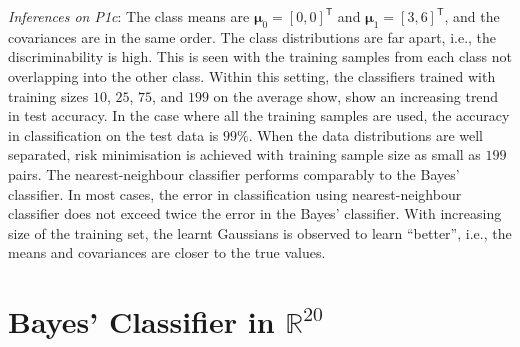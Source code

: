 \documentclass[11pt, a4 paper]{article}
\newcommand{\rr}{\mathbb{R}}
\newcommand{\TT}{\mathsf{T}}
\newcommand{\bmu}{\boldsymbol{\mu}}
\begin{document}
{\it Inferences on P1c}: The class means are $\bmu_{0} = [0,0]^{\TT}$ and $\bmu_{1} = [3,6]^{\TT}$, and the covariances are in the same order. The class distributions are far apart, i.e., the discriminability is high. This is seen with the training samples from each class not overlapping into the other class. Within this setting, the classifiers trained with training sizes $10$, $25$, $75$, and $199$ on the average show, show an increasing trend in test accuracy. In the case where all the training samples are used, the accuracy in classification on the test data is $99\%$. When the data distributions are well separated, risk minimisation is achieved with training sample size as small as $199$ pairs. The nearest-neighbour classifier performs comparably to the Bayes' classifier. In most cases, the error in classification using nearest-neighbour classifier does not exceed twice the error in the Bayes' classifier. With increasing size of the training set, the learnt Gaussians is observed to learn ``better'', i.e., the means and covariances are closer to the true values.


\label{prob:1.2}



\label{prob:1.3}



\section{Bayes' Classifier in $\rr^{20}$}
\label{sec:bayes20D}

\label{prob:2}


\end{document}
